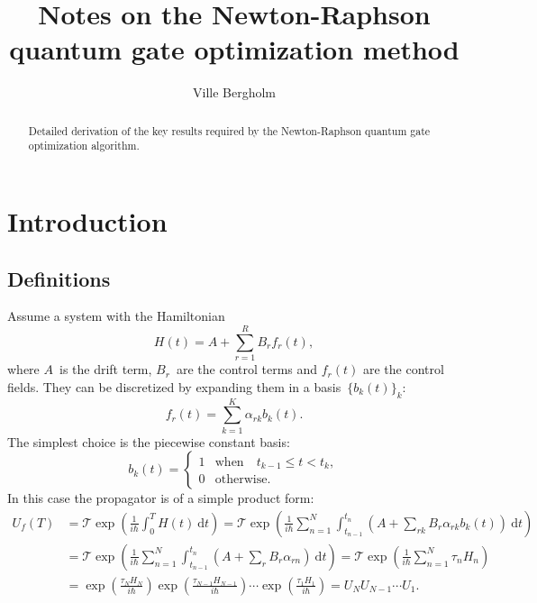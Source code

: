 \documentclass[aps,pra,12pt,showpacs,showkeys,nofootinbib,superscriptaddress,longbibliography]{revtex4}
\newcommand{\wrt}[1]{\: \mathrm{d}#1}  %
\newcommand{\be}{\begin{equation}}
\newcommand{\ee}{\end{equation}}
\begin{document}
\title{Notes on the Newton-Raphson quantum gate optimization method}

\author{Ville Bergholm}


\begin{abstract}
Detailed derivation of the key results required by the Newton-Raphson
quantum gate optimization algorithm.
\end{abstract}
\maketitle

\section{Introduction}

\subsection{Definitions}
Assume a system with the Hamiltonian
\be
H(t) = A +\sum_{r=1}^R B_r f_r(t),
\ee
where $A$~is the drift term, $B_r$~are the control terms and
$f_r(t)$ are the control fields. They can be discretized by expanding
them in a basis~$\{b_k(t)\}_k$:
\be
f_r(t) = \sum_{k=1}^K \alpha_{rk} b_k(t).
\ee
The simplest choice is the piecewise constant basis:
\be
b_k(t) = 
\begin{cases}
  1 & \text{when} \quad t_{k-1} \le t < t_k,\\
  0 & \text{otherwise}.
\end{cases}
\ee
In this case the propagator is of a simple product form:
\begin{align*}
U_f(T)
&= \mathcal{T} \exp\left(\frac{1}{i\hbar} \int_0^T H(t) \wrt{t} \right)
=  \mathcal{T} \exp\left(\frac{1}{i\hbar} \sum_{n=1}^N \int_{t_{n-1}}^{t_n} \left(A +\sum_{rk} B_r \alpha_{rk} b_k(t)\right) \wrt{t} \right)\\
&= \mathcal{T} \exp\left(\frac{1}{i\hbar} \sum_{n=1}^N \int_{t_{n-1}}^{t_n} \left(A +\sum_{r} B_r \alpha_{rn} \right) \wrt{t} \right)
= \mathcal{T} \exp\left(\frac{1}{i\hbar} \sum_{n=1}^N \tau_n H_n \right)\\
&= \exp \left(\frac{\tau_N H_N}{i\hbar}\right)
\exp \left(\frac{\tau_{N-1} H_{N-1}}{i\hbar}\right) \cdots
\exp \left(\frac{\tau_1 H_1}{i\hbar}\right)
= U_N U_{N-1} \cdots U_1.
\end{align*}
\end{document}
